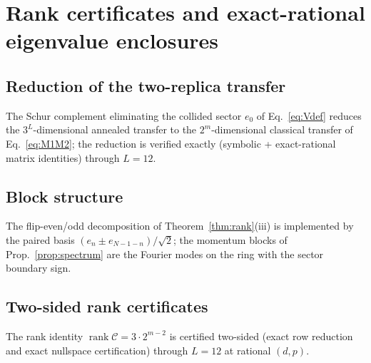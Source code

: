 \documentclass[11pt]{article}
\newcommand{\Ccomp}{\mathcal{C}}
\begin{document}
\appendix

\section{Rank certificates and exact-rational eigenvalue enclosures}
\label{app:rank3}

\subsection{Reduction of the two-replica transfer}
\label{app:reduction}
The Schur complement eliminating the collided sector $e_0$ of
Eq.~\eqref{eq:Vdef} reduces the $3^L$-dimensional annealed transfer to the
$2^m$-dimensional classical transfer of Eq.~\eqref{eq:M1M2}; the reduction
is verified exactly (symbolic + exact-rational matrix identities) through
$L=12$.

\subsection{Block structure}
\label{app:blocks}
The flip-even/odd decomposition of Theorem~\ref{thm:rank}(iii) is
implemented by the paired basis
$(e_n\pm e_{N-1-n})/\sqrt2$; the momentum blocks of Prop.~\ref{prop:spectrum}
are the Fourier modes on the ring with the sector boundary sign.

\subsection{Two-sided rank certificates}
\label{app:certificates}
The rank identity $\operatorname{rank}\Ccomp=3\cdot2^{m-2}$ is certified
two-sided (exact row reduction and exact nullspace certification) through
$L=12$ at rational $(d,p)$.
\end{document}
